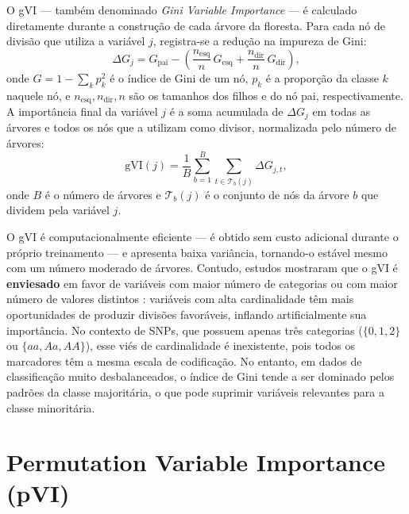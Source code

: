 \documentclass[
    12pt,
    a4paper,
    oneside,
    english,
    french,
    spanish,
    brazil
    ]{abntex2}
\newcommand{\novo}[1]{\textcolor{corNova}{#1}}
\begin{document}
\novo{O gVI --- também denominado \textit{Gini Variable Importance} --- é calculado diretamente durante a construção de cada árvore da floresta. Para cada nó de divisão que utiliza a variável $j$, registra-se a redução na impureza de Gini:
\begin{equation}
  \Delta G_j = G_{\text{pai}} - \left(\frac{n_{\text{esq}}}{n}\,G_{\text{esq}} + \frac{n_{\text{dir}}}{n}\,G_{\text{dir}}\right),
\end{equation}
onde $G = 1 - \sum_k p_k^2$ é o índice de Gini de um nó, $p_k$ é a proporção da classe $k$ naquele nó, e $n_{\text{esq}}, n_{\text{dir}}, n$ são os tamanhos dos filhos e do nó pai, respectivamente. A importância final da variável $j$ é a soma acumulada de $\Delta G_j$ em todas as árvores e todos os nós que a utilizam como divisor, normalizada pelo número de árvores:
\begin{equation}
  \mathrm{gVI}(j) = \frac{1}{B} \sum_{b=1}^{B} \sum_{t \in \mathcal{T}_b(j)} \Delta G_{j,t},
\end{equation}
onde $B$ é o número de árvores e $\mathcal{T}_b(j)$ é o conjunto de nós da árvore $b$ que dividem pela variável $j$.}

\novo{O gVI é computacionalmente eficiente --- é obtido sem custo adicional durante o próprio treinamento --- e apresenta baixa variância, tornando-o estável mesmo com um número moderado de árvores. Contudo, estudos mostraram que o gVI é \textbf{enviesado} em favor de variáveis com maior número de categorias ou com maior número de valores distintos \cite{strobl2007bias}: variáveis com alta cardinalidade têm mais oportunidades de produzir divisões favoráveis, inflando artificialmente sua importância. No contexto de SNPs, que possuem apenas três categorias ($\{0, 1, 2\}$ ou $\{aa, Aa, AA\}$), esse viés de cardinalidade é inexistente, pois todos os marcadores têm a mesma escala de codificação. No entanto, em dados de classificação muito desbalanceados, o índice de Gini tende a ser dominado pelos padrões da classe majoritária, o que pode suprimir variáveis relevantes para a classe minoritária.}

\section*{Permutation Variable Importance (pVI)}
\end{document}
